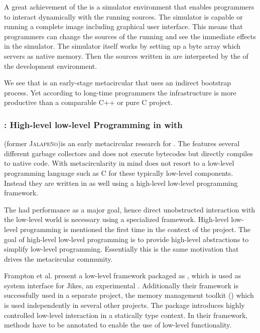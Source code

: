 A great achievement of the \Squeak \VM is a simulator environment that enables programmers to interact dynamically with the running \VM sources.
The simulator is capable or running a complete \Squeak \ST image including graphical user interface.
This means that programmers can change the sources of the running \VM and see the immediate effects in the simulator.
The simulator itself works by setting up a byte array which servers as native memory.
Then the \VM sources written in \Slang are interpreted by the \VM of the development environment.

We see that \Squeak is an early-stage metacircular \VM that uses an indirect bootstrap process.
Yet according to long-time \VM programmers the \Squeak infrastructure is more productive than a comparable C++ or pure C project.


\subsubsection*{\Jikes: High-level low-level Programming in with \MMTK}
\Jikes (former \textsc{Jalapeño})is an early metacircular research \VM for \Java \cite{Alpe00a}.
The \Jikes \VM features several different garbage collectors and does not execute bytecodes but directly compiles to native code.
With metacircularity in mind \Jikes does not resort to a low-level programming language such as C for these typically low-level \VM components.
Instead they are written in \Java as well using a high-level low-level programming framework.

The \Jikes \VM had performance as a major goal, hence direct unobstructed interaction with the low-level world is necessary using a specialized framework.
High-level low-level programming \cite{Fram09a} is mentioned the first time in the context of the \Jikes \VM project.
The goal of high-level low-level programming is to provide high-level abstractions to simplify low-level programming.
Essentially this is the same motivation that drives the metacircular \VM community.

Frampton et al. present a low-level framework packaged as , which is used as system interface for Jikes, an experimental \Java \VM.
Additionally their framework is successfully used in a separate project, the memory management toolkit (\MMTK) \cite{Blac04a} which is used independently in several other projects.
The  package introduces highly controlled low-level interaction in a statically type context.
In their framework, methods have to be annotated to enable the use of low-level functionality.

